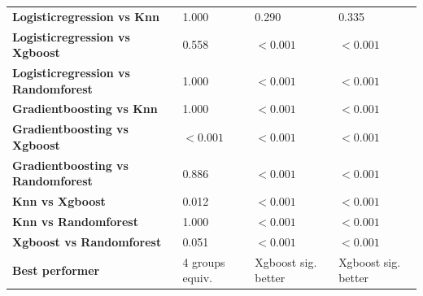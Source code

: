 \begin{table}[H]
{\begin{tabular}{llll}
        \textbf{Logisticregression vs Knn} & 1.000 & 0.290 & 0.335 \\
        \textbf{Logisticregression vs Xgboost} & 0.558 & $< 0.001$ & $< 0.001$ \\
        \textbf{Logisticregression vs Randomforest} & 1.000 & $< 0.001$ & $< 0.001$ \\
        \textbf{Gradientboosting vs Knn} & 1.000 & $< 0.001$ & $< 0.001$ \\
        \textbf{Gradientboosting vs Xgboost} & $< 0.001$ & $< 0.001$ & $< 0.001$ \\
        \textbf{Gradientboosting vs Randomforest} & 0.886 & $< 0.001$ & $< 0.001$ \\
        \textbf{Knn vs Xgboost} & 0.012 & $< 0.001$ & $< 0.001$ \\
        \textbf{Knn vs Randomforest} & 1.000 & $< 0.001$ & $< 0.001$ \\
        \textbf{Xgboost vs Randomforest} & 0.051 & $< 0.001$ & $< 0.001$ \\
        \textbf{Best performer} & 4 groups equiv. & Xgboost sig. better & Xgboost sig. better \\
        \bottomrule
    \end{tabular}}
\end{table}
